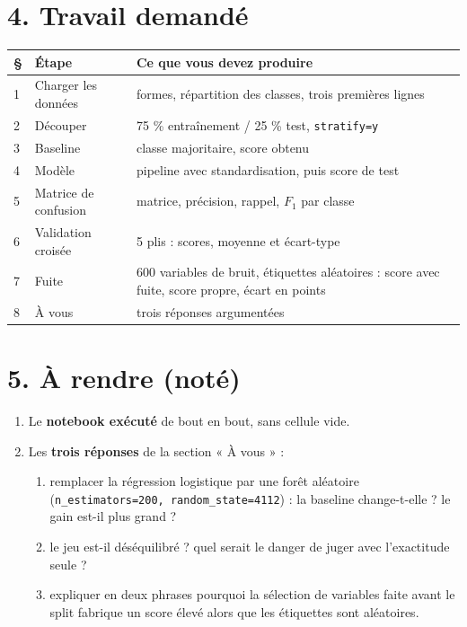 \documentclass[10.5pt,a4paper]{article}
\begin{document}
\section*{\color{bleu}4. Travail demandé}

\begin{center}
\small
\begin{tabular}{@{}p{}p{}p{}@{}}
\toprule
\textbf{\S} & \textbf{Étape} & \textbf{Ce que vous devez produire} \\
\midrule
1 & Charger les données & formes, répartition des classes, trois premières lignes \\
2 & Découper & 75 \% entraînement / 25 \% test, \texttt{stratify=y} \\
3 & Baseline & classe majoritaire, score obtenu \\
4 & Modèle & pipeline avec standardisation, puis score de test \\
5 & Matrice de confusion & matrice, précision, rappel, $F_1$ par classe \\
6 & Validation croisée & 5 plis : scores, moyenne et écart-type \\
7 & Fuite & 600 variables de bruit, étiquettes aléatoires : score avec fuite,
     score propre, écart en points \\
8 & À vous & trois réponses argumentées \\
\bottomrule
\end{tabular}
\end{center}

\section*{\color{bleu}5. À rendre (noté)}

\begin{enumerate}
  \item Le \textbf{notebook exécuté} de bout en bout, sans cellule vide.
  \item Les \textbf{trois réponses} de la section « À vous » :
        \begin{enumerate}[label=\alph*)]
          \item remplacer la régression logistique par une forêt aléatoire
                (\texttt{n\_estimators=200, random\_state=4112}) : la baseline change-t-elle ?
                le gain est-il plus grand ?
          \item le jeu est-il déséquilibré ? quel serait le danger de juger avec
                l'exactitude seule ?
          \item expliquer en deux phrases pourquoi la sélection de variables faite
                avant le split fabrique un score élevé alors que les étiquettes
                sont aléatoires.
        \end{enumerate}
\end{enumerate}
\end{document}
